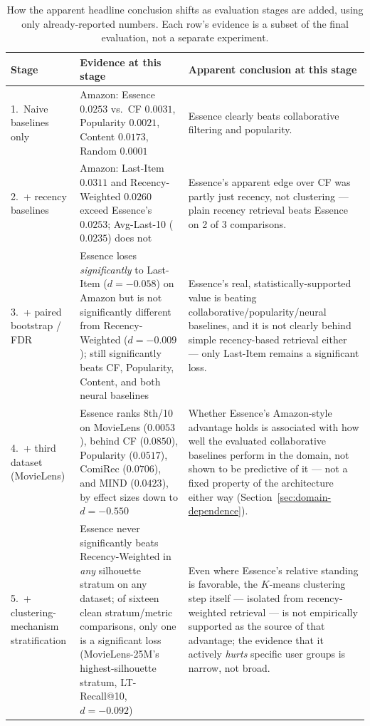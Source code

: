 \documentclass[11pt,a4paper]{article}
\begin{document}
\begin{table}[H]
\centering
\caption{How the apparent headline conclusion shifts as evaluation stages
         are added, using only already-reported numbers. Each row's
         evidence is a subset of the final evaluation, not a separate
         experiment.}
\label{tab:claim-reversal}
\small
\begin{tabular}{p{2.5cm}p{4.7cm}p{6.3cm}}
\toprule
\textbf{Stage} & \textbf{Evidence at this stage} & \textbf{Apparent conclusion at this stage} \\
\midrule
1.\ Naive baselines only & Amazon: Essence $0.0253$ vs.\ CF $0.0031$, Popularity $0.0021$, Content $0.0173$, Random $0.0001$ & Essence clearly beats collaborative filtering and popularity. \\
\midrule
2.\ + recency baselines & Amazon: Last-Item $0.0311$ and Recency-Weighted $0.0260$ exceed Essence's $0.0253$; Avg-Last-10 ($0.0235$) does not & Essence's apparent edge over CF was partly just recency, not clustering --- plain recency retrieval beats Essence on 2 of 3 comparisons. \\
\midrule
3.\ + paired bootstrap / FDR & Essence loses \emph{significantly} to Last-Item ($d=-0.058$) on Amazon but is not significantly different from Recency-Weighted ($d=-0.009$); still significantly beats CF, Popularity, Content, and both neural baselines & Essence's real, statistically-supported value is beating collaborative/popularity/neural baselines, and it is not clearly behind simple recency-based retrieval either --- only Last-Item remains a significant loss. \\
\midrule
4.\ + third dataset (MovieLens) & Essence ranks 8th/10 on MovieLens ($0.0053$), behind CF ($0.0850$), Popularity ($0.0517$), ComiRec ($0.0706$), and MIND ($0.0423$), by effect sizes down to $d=-0.550$ & Whether Essence's Amazon-style advantage holds is associated with how well the evaluated collaborative baselines perform in the domain, not shown to be predictive of it --- not a fixed property of the architecture either way (Section~\ref{sec:domain-dependence}). \\
\midrule
5.\ + clustering-mechanism stratification & Essence never significantly beats Recency-Weighted in \emph{any} silhouette stratum on any dataset; of sixteen clean stratum/metric comparisons, only one is a significant loss (MovieLens-25M's highest-silhouette stratum, LT-Recall@10, $d=-0.092$) & Even where Essence's relative standing is favorable, the $K$-means clustering step itself --- isolated from recency-weighted retrieval --- is not empirically supported as the source of that advantage; the evidence that it actively \emph{hurts} specific user groups is narrow, not broad. \\

\end{tabular}
\end{table}
\end{document}
